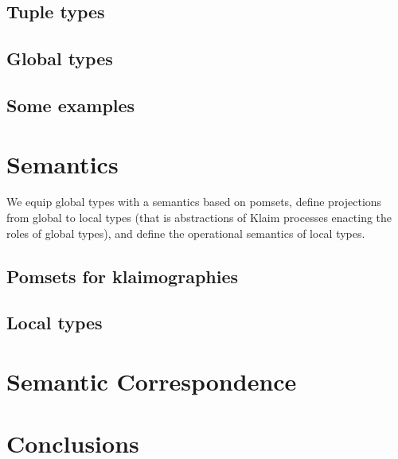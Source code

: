 \documentclass[runningheads,a4paper]{llncs}
\begin{document}
\subsection{Tuple types}
\label{sec:tuples}

\subsection{Global types}
\label{sec:gt}

\subsection{Some examples}
\label{sec:examples}

%

\section{Semantics}
We equip global types with a semantics based on pomsets,
define projections from global to local types (that is abstractions of
Klaim processes enacting the roles of global types), and define the
operational semantics of local types.
\subsection{Pomsets for klaimographies}
\label{sec:globsem}

\subsection{Local types}
\label{sec:locsem}


\section{Semantic Correspondence}
\label{sec:corr}


\section{Conclusions}
\label{sec:disc}\label{sec:conc}





\iffinal
\else
 \newpage
 \setcounter{tocdepth}{2}
 \listoffixmes
\fi
\end{document}
